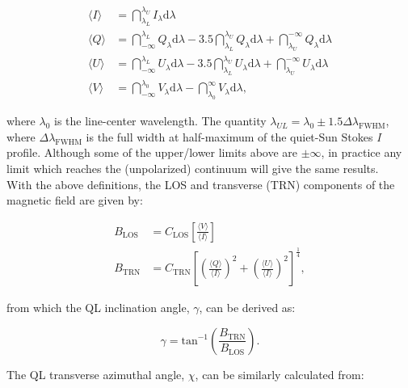 \documentclass[11pt]{article}
\begin{document}
\begin{align}
\langle I \rangle &= \dint_{\lambda_{L}}^{\lambda_{U}}I_{\lambda}\mathrm{d}\lambda\\
\langle Q \rangle &= \dint_{-\infty}^{\lambda_{L}}Q_{\lambda}\mathrm{d}\lambda -
                     3.5\dint_{\lambda_{L}}^{\lambda_{U}}Q_{\lambda}\mathrm{d}\lambda +
                     \dint_{\lambda_{U}}^{-\infty}Q_{\lambda}\mathrm{d}\lambda\\
\langle U \rangle &= \dint_{-\infty}^{\lambda_{L}}U_{\lambda}\mathrm{d}\lambda -
                     3.5\dint_{\lambda_{L}}^{\lambda_{U}}U_{\lambda}\mathrm{d}\lambda +
                     \dint_{\lambda_{U}}^{-\infty}U_{\lambda}\mathrm{d}\lambda\\
\langle V \rangle &= \dint_{-\infty}^{\lambda_{0}}V_{\lambda}\mathrm{d}\lambda -
                     \dint_{\lambda_{0}}^{\infty}V_{\lambda}\mathrm{d}\lambda,
\end{align}

where $\lambda_{0}$ is the line-center wavelength.  The quantity
$\lambda_{UL} = \lambda_{0} \pm 1.5\Delta\lambda_{\mathrm{FWHM}}$, where $\Delta\lambda_{\mathrm{FWHM}}$
is the full width at half-maximum of the quiet-Sun Stokes \textit{I} profile.  Although some of the
upper/lower limits above are $\pm\infty$, in practice any limit which reaches the (unpolarized) continuum
will give the same results.\\

With the above definitions, the LOS and transverse (TRN) components of the magnetic field are given by:

\begin{align}
B_{\mathrm{LOS}} &= C_{\mathrm{LOS}}\left[\frac{\langle V \rangle}{\langle I \rangle}\right]\label{eq:blos}\\
B_{\mathrm{TRN}} &= C_{\mathrm{TRN}}\left[\left(\frac{\langle Q \rangle}{\langle I \rangle}\right)^{2} + 
                       \left(\frac{\langle U \rangle}{\langle I \rangle}\right)^{2}\right]^{\frac{1}{4}},\label{eq:btrn}
\end{align}

from which the QL inclination angle, $\gamma$, can be derived as:

\begin{equation}
\gamma = \mathrm{tan}^{-1}\left(\frac{B_\mathrm{TRN}}{B_{\mathrm{LOS}}}\right).
\end{equation}

The QL transverse azimuthal angle, $\chi$, can be similarly calculated from:
\end{document}
